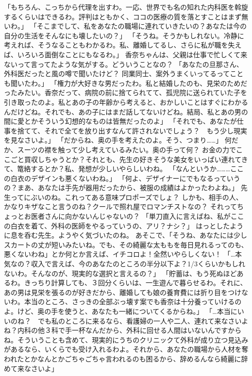 「もちろん、こっちから代理を出すわ。一応、世界でも名の知れた内科医を斡旋するくらいはできるわ。評判はともかく、ココの医療の質を落とすことはまず無いわ。」
「そこまでして、私をあなたの職場に連れていきたいの？あなたは今の自分の生活をそんなにも壊したいの？」
「そうね。そうかもしれない。冷静に考えれば、そうなることもわかるわ。私、離婚してるし、さらに私が職を失えば、いろいろ面倒なことにもなるわ。」
香奈ちゃんは、父親は仕事で忙しくて来ないって言ってたような気がする。どういうことなの？
「あなたの旦那さん、外科医だったと風の噂で聞いたけど？ 同業同士、案外うまくいってるってことも聞いたわ。」
「権力が大好きな男だったわ。私と結婚したのも、見栄のためだったみたい。香奈だって、病院の前に捨てられてて、孤児院に送られていた子を引き取ったのよ。私とあの子の年齢から考えると、おかしいことはすぐにわかるんだけどね。それでも、あの子にはまだ話してないけどね。結局、私とあの男の間に愛とかそういう幻想的なものは皆無だったのよ」
「それでも、あなたが仕事を捨てて、それで全てを放り出すなんて許されないでしょう？　もう少し現実を見なさいよ。」
「だからね、奥の手を考えたのよ。そう、つまり……」
何だか、スーツの襟を触って少し考えているみたい。奥の手って何？
お金の力でここごと買収しちゃうとか？それとも、先生の好きそうな美女をいっぱい連れてきて、篭絡するとか？私、発想が少しいやらしいわね。
「なんというか………ここの白衣のデザインも悪くないわね。」
「何よ、デザイナーにでもなるっていうの？まあ、あなたは手先が器用だったから、被服の成績はよかったわよね。」
先生ってにぶいのね。これってある意味プロポーズでしょ？
しかも、相手の人、かなりキザなこと言うのね？クールで照れ屋でロマンチストなの？
それってちょっとお医者さんに向かないんじゃないの？
「単刀直入に言えばね、私がここの白衣を着て、外科の医師をやるっていうの、アリ？ナシ？」
はっとしたように息を呑む先生。ようやく気づいたのね。
あそこで、「そうね、あなたには少しスカートの丈が短いみたいね。でも、その綺麗な太ももを毎日見れるってのも、悪くないわね」とか何とか言えば、イチコロよ！全然いやらしくない！
「…本気なの？収入で言えば、今のあなたのところの半分以下よ？1/3くらいかもしれないわ。そんなのが、現実的な選択と言えるの？」
「貯蓄は、もう死ぬほどあるわ。きっちり計算しても、３回分くらいは、一生遊んで暮らせるわ。それに、あの男は見栄を張るのが好きだから、離婚しても娘の養育費には折り目をつけないわ。本当のところ、さっきの全部ぶっ壊す案でも香奈は十分養っていけるのよ。けど、奥の手を使うと、あなたも一緒についてくるからね。」
「…本当にいいのね？　でも私のところに来るなら、看護婦の一人や二人、連れて来なさいよね？内科の他３科で手一杯なんだから、外科に回せる人間はいないんですからね。そういうことも含めて、現実的にうちのクリニックて外科が成り立つ見込みがあるなら、いくらでも受け入れるわよ。それから、あなたの職場から人材を奪われたとかなんとかごちゃごちゃ言われるのも困るから、辞めるんなら綺麗に辞めて来なさいよ」
